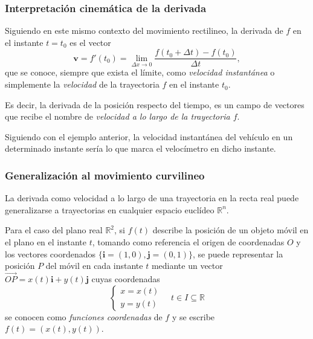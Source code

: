 \begin{frame}
\frametitle{Interpretación cinemática de la derivada}
Siguiendo en este mismo contexto del movimiento rectilineo, la derivada de $f$ en el instante $t=t_0$ es el vector
\[
\mathbf{v}=f'(t_0)=\lim_{\Delta x\rightarrow 0}\frac{f(t_0+\Delta t)-f(t_0)}{\Delta t},
\]
que se conoce, siempre que exista el límite, como \emph{velocidad instantánea} o simplemente la \emph{velocidad} de la
trayectoria $f$ en el instante $t_0$.

Es decir, la derivada de la posición respecto del tiempo, es un campo de vectores que recibe el nombre de
\emph{velocidad a lo largo de la trayectoria $f$}.

Siguiendo con el ejemplo anterior, la velocidad instantánea del vehículo en un determinado instante sería lo que marca
el velocímetro en dicho instante.
\end{frame}


\begin{frame}
\frametitle{Generalización al movimiento curvilineo}
La derivada como velocidad a lo largo de una trayectoria en la recta real puede generalizarse a trayectorias en cualquier
espacio euclídeo $\mathbb{R}^n$.

Para el caso del plano real $\mathbb{R}^2$, si $f(t)$ describe la posición de un objeto móvil en el plano en el instante
$t$, tomando como referencia el origen de coordenadas $O$ y los vectores coordenados
$\{\mathbf{i}=(1,0),\mathbf{j}=(0,1)\}$, se puede representar la posición $P$ del móvil en cada instante $t$ mediante un
vector $\vec{OP}=x(t)\mathbf{i}+y(t)\mathbf{j}$ cuyas coordenadas
\[
\begin{cases}
x=x(t)\\
y=y(t)
\end{cases}
\quad
t\in I\subseteq \mathbb{R}
\]
se conocen como \emph{funciones coordenadas} de $f$ y se escribe $f(t)=(x(t),y(t))$.

\begin{center}
\scalebox{0.8}{}
\end{center}  
\end{frame}


